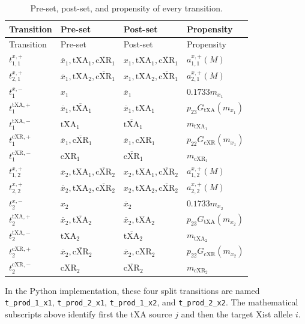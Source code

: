 \documentclass[11pt,a4paper]{article}
\newcommand{\txa}{\mathrm{tXA}}
\newcommand{\cxr}{\mathrm{cXR}}
\begin{document}
\renewcommand{\arraystretch}{1.18}
\begin{longtable}{@{}p{2.3cm}p{3.4cm}p{3.4cm}p{4.6cm}@{}}
\caption{Pre-set, post-set, and propensity of every transition.}
\label{tab:transitions}\\
\toprule
Transition & Pre-set & Post-set & Propensity \\
\midrule
\endfirsthead
\toprule
Transition & Pre-set & Post-set & Propensity \\
\midrule
\endhead
$t^{x,+}_{1,1}$ & $\overline{x}_1,\txa_1,\overline{\cxr}_1$
 & $x_1,\txa_1,\overline{\cxr}_1$ & $a^{x,+}_{1,1}(M)$ \\
$t^{x,+}_{2,1}$ & $\overline{x}_1,\txa_2,\overline{\cxr}_1$
 & $x_1,\txa_2,\overline{\cxr}_1$ & $a^{x,+}_{2,1}(M)$ \\
$t^{x,-}_{1}$ & $x_1$ & $\overline{x}_1$ & $0.1733m_{x_1}$ \\
$t^{\txa,+}_{1}$ & $\overline{x}_1,\overline{\txa}_1$
 & $\overline{x}_1,\txa_1$ & $p_{23}G_{\txa}(m_{x_1})$ \\
$t^{\txa,-}_{1}$ & $\txa_1$ & $\overline{\txa}_1$ & $m_{\txa_1}$ \\
$t^{\cxr,+}_{1}$ & $\overline{x}_1,\overline{\cxr}_1$
 & $\overline{x}_1,\cxr_1$ & $p_{22}G_{\cxr}(m_{x_1})$ \\
$t^{\cxr,-}_{1}$ & $\cxr_1$ & $\overline{\cxr}_1$ & $m_{\cxr_1}$ \\
\midrule
$t^{x,+}_{1,2}$ & $\overline{x}_2,\txa_1,\overline{\cxr}_2$
 & $x_2,\txa_1,\overline{\cxr}_2$ & $a^{x,+}_{1,2}(M)$ \\
$t^{x,+}_{2,2}$ & $\overline{x}_2,\txa_2,\overline{\cxr}_2$
 & $x_2,\txa_2,\overline{\cxr}_2$ & $a^{x,+}_{2,2}(M)$ \\
$t^{x,-}_{2}$ & $x_2$ & $\overline{x}_2$ & $0.1733m_{x_2}$ \\
$t^{\txa,+}_{2}$ & $\overline{x}_2,\overline{\txa}_2$
 & $\overline{x}_2,\txa_2$ & $p_{23}G_{\txa}(m_{x_2})$ \\
$t^{\txa,-}_{2}$ & $\txa_2$ & $\overline{\txa}_2$ & $m_{\txa_2}$ \\
$t^{\cxr,+}_{2}$ & $\overline{x}_2,\overline{\cxr}_2$
 & $\overline{x}_2,\cxr_2$ & $p_{22}G_{\cxr}(m_{x_2})$ \\
$t^{\cxr,-}_{2}$ & $\cxr_2$ & $\overline{\cxr}_2$ & $m_{\cxr_2}$ \\
\bottomrule
\end{longtable}

In the Python implementation, these four split transitions are named
\texttt{t\_prod\_1\_x1}, \texttt{t\_prod\_2\_x1},
\texttt{t\_prod\_1\_x2}, and \texttt{t\_prod\_2\_x2}.  The mathematical
subscripts above identify first the tXA source $j$ and then the target Xist
allele $i$.
\end{document}
